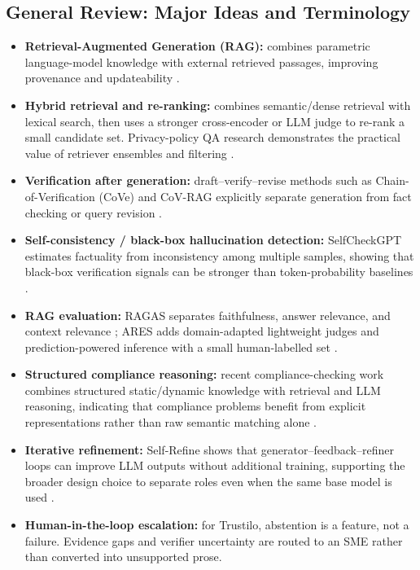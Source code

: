 \documentclass[11pt,journal,onecolumn]{IEEEtran}
\begin{document}
\subsection{General Review: Major Ideas and Terminology}
\begin{itemize}[leftmargin=1.7em]
    \item \textbf{Retrieval-Augmented Generation (RAG):} combines parametric language-model knowledge with external retrieved passages, improving provenance and updateability \cite{lewis2020rag}.
    \item \textbf{Hybrid retrieval and re-ranking:} combines semantic/dense retrieval with lexical search, then uses a stronger cross-encoder or LLM judge to re-rank a small candidate set. Privacy-policy QA research demonstrates the practical value of retriever ensembles and filtering \cite{parvez2023privacyqa}.
    \item \textbf{Verification after generation:} draft--verify--revise methods such as Chain-of-Verification (CoVe) and CoV-RAG explicitly separate generation from fact checking or query revision \cite{dhuliawala2024cove,he2024covrag}.
    \item \textbf{Self-consistency / black-box hallucination detection:} SelfCheckGPT estimates factuality from inconsistency among multiple samples, showing that black-box verification signals can be stronger than token-probability baselines \cite{manakul2023selfcheckgpt}.
    \item \textbf{RAG evaluation:} RAGAS separates faithfulness, answer relevance, and context relevance \cite{es2024ragas}; ARES adds domain-adapted lightweight judges and prediction-powered inference with a small human-labelled set \cite{saadfalcon2024ares}.
    \item \textbf{Structured compliance reasoning:} recent compliance-checking work combines structured static/dynamic knowledge with retrieval and LLM reasoning, indicating that compliance problems benefit from explicit representations rather than raw semantic matching alone \cite{sun2025compliance}.
    \item \textbf{Iterative refinement:} Self-Refine shows that generator--feedback--refiner loops can improve LLM outputs without additional training, supporting the broader design choice to separate roles even when the same base model is used \cite{madaan2023selfrefine}.
    \item \textbf{Human-in-the-loop escalation:} for Trustilo, abstention is a feature, not a failure. Evidence gaps and verifier uncertainty are routed to an SME rather than converted into unsupported prose.
\end{itemize}
\end{document}
